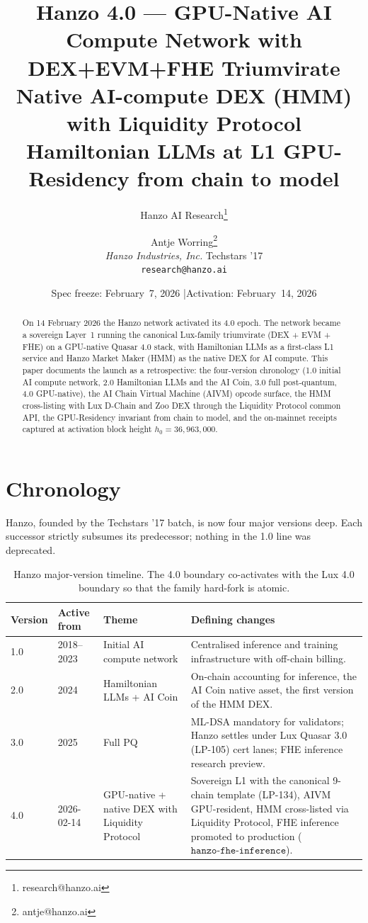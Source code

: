\documentclass[11pt,letterpaper]{article}
\title{Hanzo 4.0 --- GPU-Native AI Compute Network with DEX+EVM+FHE Triumvirate\\[6pt]
\large Native AI-compute DEX (HMM) with Liquidity Protocol\\
Hamiltonian LLMs at L1 \quad GPU-Residency from chain to model}
\author{
Hanzo AI Research\thanks{research@hanzo.ai} \and Antje Worring\thanks{antje@hanzo.ai}\\
\textit{Hanzo Industries, Inc.} \quad Techstars '17\\
\texttt{research@hanzo.ai}
}
\date{Spec freeze: February~7, 2026 \quad|\quad Activation: February~14, 2026}
\begin{document}
\hanzocoverpage
\maketitle

\begin{abstract}
On 14 February 2026 the Hanzo network activated its 4.0 epoch.
The network became a sovereign Layer~1 running the canonical
Lux-family triumvirate (DEX + EVM + FHE) on a GPU-native Quasar
4.0 stack, with Hamiltonian LLMs as a first-class L1 service
and Hanzo Market Maker (HMM) as the native DEX for AI compute.
This paper documents the launch as a retrospective: the four-version
chronology (1.0 initial AI compute network, 2.0 Hamiltonian LLMs and
the AI Coin, 3.0 full post-quantum, 4.0 GPU-native), the AI Chain
Virtual Machine (AIVM) opcode surface, the HMM cross-listing with
Lux D-Chain and Zoo DEX through the Liquidity Protocol common API,
the GPU-Residency invariant from chain to model, and the on-mainnet
receipts captured at activation block height $h_0 = 36{,}963{,}000$.
\end{abstract}

\tableofcontents
\newpage

\section{Chronology}
\label{sec:chronology}

Hanzo, founded by the Techstars '17 batch, is now four major versions
deep. Each successor strictly subsumes its predecessor; nothing in the
1.0 line was deprecated.

\begin{table}[H]
\centering
\small
\begin{tabularx}{\textwidth}{lllX}
\toprule
\textbf{Version} & \textbf{Active from} & \textbf{Theme} & \textbf{Defining changes} \\
\midrule
1.0 & 2018--2023 & Initial AI compute network & Centralised inference and
training infrastructure with off-chain billing. \\
2.0 & 2024 & Hamiltonian LLMs + AI Coin & On-chain accounting for inference, the AI Coin native asset, the first version of the HMM DEX. \\
3.0 & 2025 & Full PQ & ML-DSA mandatory for validators; Hanzo settles
under Lux Quasar 3.0 (LP-105) cert lanes; FHE inference research preview. \\
4.0 & 2026-02-14 & GPU-native + native DEX with Liquidity Protocol &
Sovereign L1 with the canonical 9-chain template (LP-134), AIVM
GPU-resident, HMM cross-listed via Liquidity Protocol, FHE inference promoted to production
($\texttt{hanzo-fhe-inference}$). \\
\bottomrule
\end{tabularx}
\caption{Hanzo major-version timeline. The 4.0 boundary co-activates
with the Lux 4.0 boundary so that the family hard-fork is atomic.}
\end{table}
\end{document}
